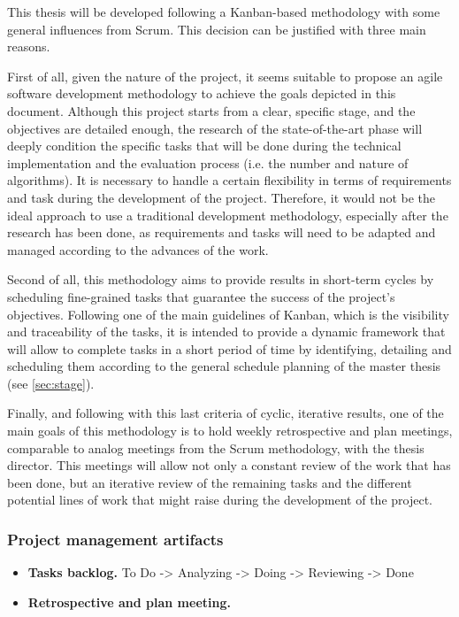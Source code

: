 \documentclass[a4paper]{article}
\begin{document}
This thesis will be developed following a Kanban-based methodology with some general influences from Scrum. This decision can be justified with three main reasons.

First of all, given the nature of the project, it seems suitable to propose an agile software development methodology to achieve the goals depicted in this document. Although this project starts from a clear, specific stage, and the objectives are detailed enough, the research of the state-of-the-art phase will deeply condition the specific tasks that will be done during the technical implementation and the evaluation process (i.e. the number and nature of algorithms). It is necessary to handle a certain flexibility in terms of requirements and task during the development of the project. Therefore, it would not be the ideal approach to use a traditional development methodology, especially after the research has been done, as requirements and tasks will need to be adapted and managed according to the advances of the work.

Second of all, this methodology aims to provide results in short-term cycles by scheduling fine-grained tasks that guarantee the success of the project's objectives. Following one of the main guidelines of Kanban, which is the visibility and traceability of the tasks, it is intended to provide a dynamic framework that will allow to complete tasks in a short period of time by identifying, detailing and scheduling them according to the general schedule planning of the master thesis (see \ref{sec:stage}).

Finally, and following with this last criteria of cyclic, iterative results, one of the main goals of this methodology is to hold weekly retrospective and plan meetings, comparable to analog meetings from the Scrum methodology, with the thesis director. This meetings will allow not only a constant review of the work that has been done, but an iterative review of the remaining tasks and the different potential lines of work that might raise during the development of the project. 

\subsubsection{Project management artifacts}

\begin{itemize}
\item \textbf{Tasks backlog.} To Do -> Analyzing -> Doing -> Reviewing -> Done
\item \textbf{Retrospective and plan meeting.}
\end{itemize}
\end{document}
